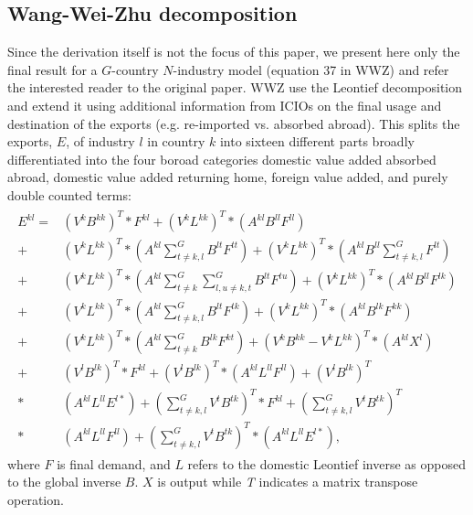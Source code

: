 \documentclass[11pt,a4paper]{article}
\begin{document}
\subsection{Wang-Wei-Zhu decomposition}\label{sub:wwz}

Since the derivation itself is not the focus of this paper, we present here only the final result for a $G$-country $N$-industry model (equation 37 in WWZ) and refer the interested reader to the original paper. WWZ use the Leontief decomposition and extend it using additional information from ICIOs on the final usage and destination of the exports (e.g. re-imported vs. absorbed abroad). This splits the exports, $E$, of industry $l$ in country $k$ into sixteen different parts broadly differentiated into the four boroad categories domestic value added absorbed abroad, domestic value added returning home, foreign value added, and purely double counted terms:
\begin{align}\label{eq:wwz}
\begin{split}
E^{kl}
= &\left(V^k B^{kk} \right)^T * F^{kl} 
+ \left(V^k L^{kk} \right)^T * \left(A^{kl} B^{ll} F^{ll} \right)\\
+& \left(V^k L^{kk} \right)^T * (A^{kl} \sum_{t \neq k,l}^G  B^{lt} F^{tt} )
+ \left(V^k L^{kk} \right)^T *  (A^{kl} B^{ll} \sum_{t \neq k,l}^G  F^{lt} )\\ 
+&  \left(V^k L^{kk} \right)^T * (A^{kl} \sum_{t \neq k}^G \sum_{l,u \neq k,t}^G B^{lt} F^{tu} )
+ \left(V^k L^{kk} \right)^T * \left(A^{kl} B^{ll} F^{lk} \right)\\
+& \left(V^k L^{kk} \right)^T * (A^{kl} \sum_{t \neq k,l}^G  B^{lt} F^{tk} )
+ \left(V^k L^{kk} \right)^T * \left(A^{kl} B^{lk} F^{kk} \right) \\
+& \left(V^k L^{kk} \right)^T * (A^{kl} \sum_{t \neq k}^G  B^{lk} F^{kt} )
+ \left(V^k B^{kk} -  V^k L^{kk} \right)^T * \left(A^{kl} X^{l}  \right)\\
+& \left(V^l B^{lk} \right)^T * F^{kl}
+ \left(V^l B^{lk} \right)^T *  \left(A^{kl} L^{ll} F^{ll} \right)
+ \left(V^l B^{lk} \right)^T \\
*&  \left(A^{kl} L^{ll} E^{l*} \right) + (\sum_{t \neq k,l}^G  V^{t} B^{tk} )^{T} * F^{kl}
+ (\sum_{t \neq k,l}^G  V^{t} B^{tk} )^{T}\\
*&   \left(A^{kl} L^{ll} F^{ll} \right) + (\sum_{t \neq k,l}^G  V^{t} B^{tk} )^{T} *  \left(A^{kl} L^{ll} E^{l*} \right) ,
\end{split}
\end{align}
where $F$ is final demand, and $L$ refers to the domestic Leontief inverse as opposed to the global inverse $B$. $X$ is output while \textit{T} indicates a matrix transpose operation. 
\end{document}
